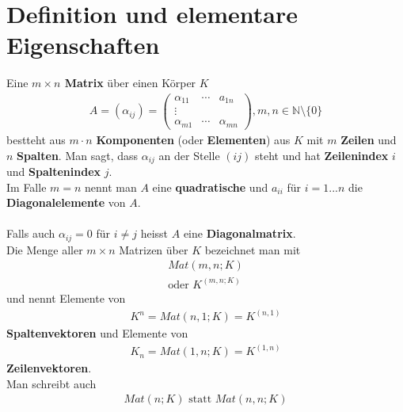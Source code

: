 \documentclass[11pt]{report}
\newcommand*\Zb[1] {\mathbb{#1}}
\newcommand*\f[1] {\textbf{#1}}
\begin{document}
\section{Definition und elementare Eigenschaften}
Eine \f{$m \times n$ Matrix} über einen Körper $K$
\begin{align}
 A = (\alpha_{ij}) = \begin{pmatrix} \alpha_{11} & \cdots &a_{1n} \\ \vdots & & \\ \alpha_{m1} & \cdots & \alpha_{mn} \end{pmatrix}, m, n \in \Zb{N}\setminus \{0\}
\end{align}
bestteht aus $m\cdot n$ \f{Komponenten} (oder \f{Elementen}) aus $K$ mit $m$ \f{Zeilen} und $n$ \f{Spalten}. Man sagt, dass $\alpha_{ij}$ an der Stelle $(ij)$ steht und hat \f{Zeilenindex} $i$ und \f{Spaltenindex} $j$. \\
Im Falle $m=n$ nennt man $A$ eine \f{quadratische} und $a_{ii}$ für $i=1...n$ die \f{Diagonalelemente} von $A$. \\\\
Falls auch $\alpha_{ij} = 0$ für $i \neq j$ heisst $A$ eine \f{Diagonalmatrix}.\\
Die Menge aller $m \times n$ Matrizen über $K$ bezeichnet man mit 
\begin{align}
 Mat(m,n;K)  \\
\text{oder } K^{(m,n;K)}
\end{align}
und nennt Elemente von 
\begin{align}
 K^n = Mat(n,1;K) = K^{(n,1)}
\end{align}
\f{Spaltenvektoren} und Elemente von 
\begin{align}
 K_n = Mat(1,n;K) = K^{(1,n)}
\end{align}
\f{Zeilenvektoren}.\\
Man schreibt auch
\begin{align}
 Mat(n;K) \text{ statt } Mat(n,n; K)
\end{align}
\end{document}
